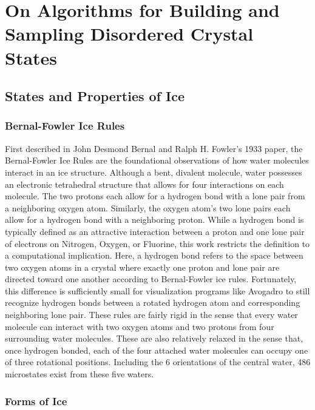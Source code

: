 \chapter{On Algorithms for Building and Sampling Disordered Crystal States}
\label{ch:iceXI}

\section{States and Properties of Ice}


\subsection{Bernal-Fowler Ice Rules}

First described in John Desmond Bernal and Ralph H. Fowler's 1933 paper, the Bernal-Fowler Ice Rules are the foundational observations of how water molecules interact in an ice structure.\cite{BFIceOG}
Although a bent, divalent molecule, water possesses an electronic tetrahedral structure that allows for four interactions on each molecule.
The two protons each allow for a hydrogen bond with a lone pair from a neighboring oxygen atom.
Similarly, the oxygen atom's two lone pairs each allow for a hydrogen bond with a neighboring proton. 
While a hydrogen bond is typically defined as an attractive interaction between a proton and one lone pair of electrons on Nitrogen, Oxygen, or Fluorine, this work restricts the definition to a computational implication.
Here, a hydrogen bond refers to the space between two oxygen atoms in a crystal where exactly one proton and lone pair are directed toward one another according to Bernal-Fowler ice rules. 
Fortunately, this difference is sufficiently small for visualization programs like Avogadro to still recognize hydrogen bonds between a rotated hydrogen atom and corresponding neighboring lone pair. 
These rules are fairly rigid in the sense that every water molecule can interact with two oxygen atoms and two protons from four surrounding water molecules.
These are also relatively relaxed in the sense that, once hydrogen bonded, each of the four attached water molecules can occupy one of three rotational positions. 
Including the 6 orientations of the central water, 486 microstates exist from these five waters.

\subsection{Forms of Ice}

